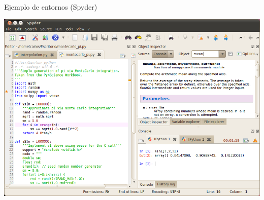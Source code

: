 \documentclass[bigger,unknownkeysallowed]{beamer}
\begin{document}
\begin{frame}[label={sec:orgb6d909f}]{Ejemplo de entornos (Spyder)}
\begin{center}
\includegraphics[width=.8\textwidth]{spyder.png}
\end{center}
\end{frame}
\end{document}
